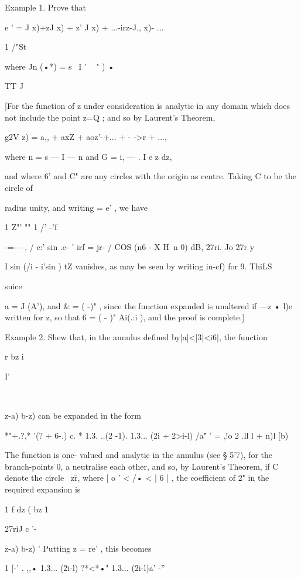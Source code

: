 {{Example 1. Prove that 

e '   = J  x)+zJ  x) + z' J  x) + ...-irz-J,, x)- ... 

1 /"St 

where Jn (•*) = s~ I   '  ~   "  )  • 

 TT J 

[For the function of z under consideration is analytic in any domain which does not 
include the point z=Q ; and so by Laurent's Theorem, 

g2V z) = a,, + axZ + aoz'-+... + - ->r  + ..., 

where  n = s —   I   — n and G  = i, — . I e z dz, 

and where 6' and C" are any circles with the origin as centre. Taking C to be the circle of 

radius unity, and writing = e' , we have 

1 Z"' "" 1 /' -'f 

 -=-—, / e:' sin .e- ' irf  = jr- / COS (n6 - X H\ n 0) dB, 
27ri. Jo 27r y 

I sin (/i - i'sin  ) tZ  vanishes, as may be seen by writing in-cf) for 9. ThiLS 



suice 



a  = J (A'), and \&  = ( -)"  , since the function expanded is unaltered if —z • l)e written 
for z, so that 6  = ( - )" Ai(.:i ), and the proof is complete.] 

Example 2. Shew that, in the annulus defined by|a|<|3|<i6|, the function 

r bz  i 



I' 



\ \ {z-a) b-z)  
can be expanded in the form 

*"+.?,* '(? + 6-.)   
c. * 1.3. ..(2 -1). 1.3... (2i + 2>i-l) /a\' 
"   '  = ,!o 2  .ll l + n)l [b)   

The function is one- valued and analytic in the annulus (see § 5'7), for the branch-points 
0, a neutralise each other, and so, by Laurent's Theorem, if C denote the circle \ z\=r, 
where | o ' < /• < | 6 | , the coefficient of 2" in the required expansion is 

1 f dz ( bz 1  

27riJ c '- \ \ {z-a) b-z)  ' 
Putting z = re' , this becomes 

1 [-'  . ,,• 1.3... (2i-l) ?*<*•" 1.3... (2i-l)a' -''  

}}}}
